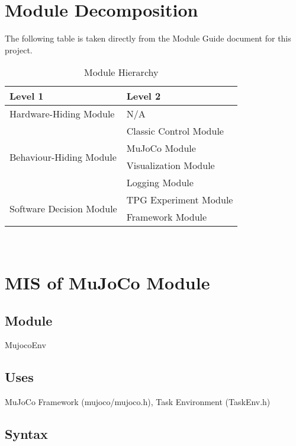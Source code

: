 \documentclass[12pt, titlepage]{article}
\begin{document}
\section{Module Decomposition}

The following table is taken directly from the Module Guide document for this project.

\begin{table}[h!]
  \centering
  \begin{tabular}{p{} p{}}
  \toprule
  \textbf{Level 1} & \textbf{Level 2}\\
  \midrule
  
  {Hardware-Hiding Module} & N/A \\
  \midrule
  
  \multirow{4}{0.3\textwidth}{Behaviour-Hiding Module} & Classic Control Module \\
  & MuJoCo Module\\
  & Visualization Module\\
  & Logging Module\\
  \midrule
  
  \multirow{2}{0.3\textwidth}{Software Decision Module} & {TPG Experiment Module}\\
  & Framework Module\\
  \bottomrule
  
  \end{tabular}
  \caption{Module Hierarchy}
  \label{TblMH}
  \end{table}

\newpage
~\newpage

\section{MIS of MuJoCo Module} \label{MuJoCo Module}

\subsection{Module}
MujocoEnv

\subsection{Uses}
MuJoCo Framework (mujoco/mujoco.h), Task Environment (TaskEnv.h)

\subsection{Syntax}
\end{document}
